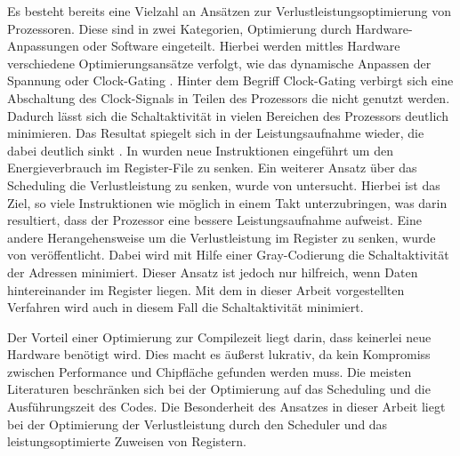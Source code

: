 Es besteht bereits eine Vielzahl an Ansätzen zur Verlustleistungsoptimierung von Prozessoren. Diese sind in zwei Kategorien, Optimierung durch Hardware-Anpassungen\cite{wu2000clock, horowitz1994low, hajj1998architectural} oder Software \cite{gebotys1997low, asanovic2000energy, toburen1998instruction, su1995cache } eingeteilt. Hierbei werden mittles Hardware verschiedene Optimierungsansätze verfolgt, wie das dynamische Anpassen der Spannung \cite{horowitz1994low} oder Clock-Gating \cite{wu2000clock}. Hinter dem Begriff Clock-Gating verbirgt sich eine Abschaltung des Clock-Signals in Teilen des Prozessors die nicht genutzt werden. Dadurch lässt sich die Schaltaktivität in vielen Bereichen des Prozessors deutlich minimieren. Das Resultat spiegelt sich in der Leistungsaufnahme wieder, die dabei deutlich sinkt \cite{donno2003clock}. In \cite{asanovic2000energy} wurden neue Instruktionen eingeführt um den Energieverbrauch im Register-File zu senken. Ein weiterer Ansatz über das Scheduling die Verlustleistung zu senken, wurde von\cite{toburen1998instruction} untersucht. Hierbei ist das Ziel, so viele Instruktionen wie möglich in einem Takt unterzubringen, was darin resultiert, dass der Prozessor eine bessere Leistungsaufnahme aufweist.
Eine andere Herangehensweise um die Verlustleistung im Register zu senken, wurde von \cite{su1995cache} veröffentlicht. Dabei wird mit Hilfe einer Gray-Codierung die Schaltaktivität der Adressen minimiert.\cite{su1995cache} Dieser Ansatz ist jedoch nur hilfreich, wenn Daten hintereinander im Register liegen. Mit dem in dieser Arbeit vorgestellten Verfahren wird auch in diesem Fall die Schaltaktivität minimiert.

Der Vorteil einer Optimierung zur Compilezeit liegt darin, dass keinerlei neue Hardware benötigt wird. Dies macht es äußerst lukrativ, da kein Kompromiss zwischen Performance und Chipfläche gefunden werden  muss. Die meisten Literaturen beschränken sich bei der Optimierung auf das Scheduling und die Ausführungszeit des Codes. Die Besonderheit des Ansatzes in dieser Arbeit liegt bei der Optimierung der Verlustleistung durch den Scheduler und das leistungsoptimierte Zuweisen von Registern.

